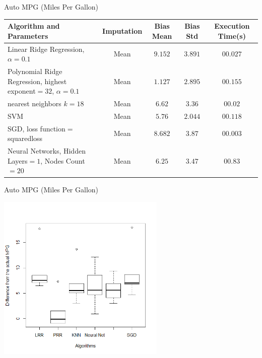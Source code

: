 \begin{frame}{Auto MPG (Miles Per Gallon)}
\begin{tcolorbox}[colback=LightSteelBlue!5,colframe=yellow!40!black,title=Final
Comparison]


\begin{table}
\centering
\resizebox{\columnwidth}{!}
	{
		\begin{tabular}{|p{4cm}|c|c|c|c|}
		\hline Algorithm and Parameters & Imputation & Bias Mean & Bias Std & Execution Time(s)\\
		
		\hline Linear Ridge Regression, $\alpha=0.1$ & Mean & $9.152$ & $3.891$ & $00.027$ \\
		
		\hline Polynomial Ridge Regression, highest exponent$=32$, $\alpha=0.1$ & Mean & $\mathbf{1.127}$ & $2.895$ & $00.155$  \\
		
		\hline nearest neighbors $k=18$ & Mean & $6.62$ & $3.36$ & $00.02$  \\
		
		\hline SVM & Mean & $5.76$ & $\mathbf{2.044}$ & $00.118$  \\
		
		\hline SGD, loss function$=$squaredloss & Mean & $8.682$ & $3.87$ & $\mathbf{00.003}$  \\
		
		\hline Neural Networks, Hidden Layers$=1$, Nodes Count$=20$ & Mean & $6.25$ & $3.47$ & $00.83$  \\
		
		\hline
		\end{tabular}
	}



\end{table}



\end{tcolorbox}
\end{frame}

\begin{frame}{Auto MPG (Miles Per Gallon)}
\begin{center}
\includegraphics[height=8cm]{../doc/src/report1/figures/mpg_bestresults.png}
\end{center}

\end{frame}

